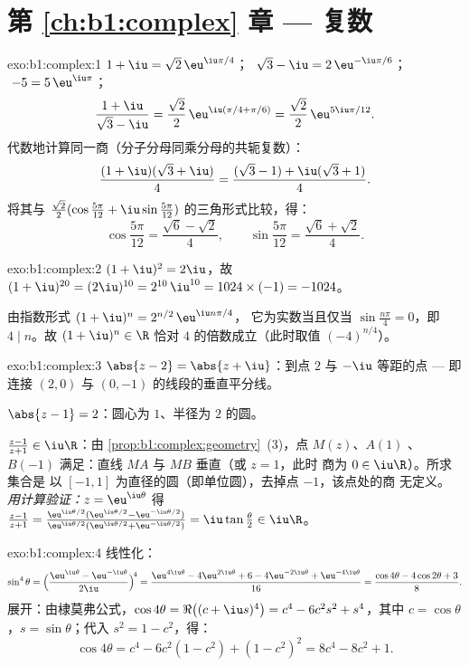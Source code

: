 \section*{第 \ref{ch:b1:complex} 章 --- 复数}

\begin{solution}{exo:b1:complex:1}
$1 + \iu = \sqrt 2\, \eu^{\iu\pi/4}$；
$\;\sqrt 3 - \iu = 2\, \eu^{-\iu\pi/6}$；
$\;-5 = 5\, \eu^{\iu\pi}$；
\[
\frac{1 + \iu}{\sqrt 3 - \iu}
= \frac{\sqrt 2}{2}\, \eu^{\iu(\pi/4 + \pi/6)}
= \frac{\sqrt 2}{2}\, \eu^{5\iu\pi/12}.
\]
代数地计算同一商（分子分母同乘分母的共轭复数）：
\[
\frac{(1 + \iu)(\sqrt 3 + \iu)}{4}
= \frac{(\sqrt 3 - 1) + \iu(\sqrt 3 + 1)}{4}.
\]
将其与 $\frac{\sqrt 2}{2}(\cos\frac{5\pi}{12} +
\iu\sin\frac{5\pi}{12})$ 的三角形式比较，得：
\[
\cos\frac{5\pi}{12} = \frac{\sqrt 6 - \sqrt 2}{4},
\qquad
\sin\frac{5\pi}{12} = \frac{\sqrt 6 + \sqrt 2}{4}.
\]
\end{solution}

\begin{solution}{exo:b1:complex:2}
$(1+\iu)^2 = 2\iu$，故 $(1+\iu)^{20} = (2\iu)^{10} = 2^{10}\,\iu^{10}
= 1024 \times (-1) = -1024$。

由指数形式 $(1+\iu)^n = 2^{n/2}\, \eu^{\iu n\pi/4}$，
它为实数当且仅当 $\sin\frac{n\pi}{4} = 0$，即 $4 \mid n$。故 $(1+\iu)^n
\in \R$ 恰对 $4$ 的倍数成立（此时取值 $(-4)^{n/4}$）。
\end{solution}

\begin{solution}{exo:b1:complex:3}
$\abs{z - 2} = \abs{z + \iu}$：到点 $2$ 与
$-\iu$ 等距的点 --- 即连接 $(2, 0)$
与 $(0, -1)$ 的线段的垂直平分线。

$\abs{z - 1} = 2$：圆心为 $1$、半径为 $2$ 的圆。

$\frac{z-1}{z+1} \in \iu\R$：由
\cref{prop:b1:complex:geometry}~(3)，点 $M(z)$、$A(1)$
、$B(-1)$ 满足：直线 $MA$ 与 $MB$ 垂直（或 $z = 1$，此时
商为 $0 \in \iu\R$）。所求集合是
以 $[-1, 1]$ 为直径的圆（即单位圆），去掉点 $-1$，该点处的商
无定义。\emph{用计算验证：}$z = \eu^{\iu\theta}$ 得
$\frac{z-1}{z+1} = \frac{\eu^{\iu\theta/2}(\eu^{\iu\theta/2} -
\eu^{-\iu\theta/2})}{\eu^{\iu\theta/2}(\eu^{\iu\theta/2} +
\eu^{-\iu\theta/2})} = \iu\tan\frac\theta2 \in \iu\R$。
\end{solution}

\begin{solution}{exo:b1:complex:4}
线性化：
\[
\sin^4\theta
= \Bigl(\frac{\eu^{\iu\theta} - \eu^{-\iu\theta}}{2\iu}\Bigr)^{\!4}
= \frac{\eu^{4\iu\theta} - 4\eu^{2\iu\theta} + 6 - 4\eu^{-2\iu\theta}
+ \eu^{-4\iu\theta}}{16}
= \frac{\cos 4\theta - 4\cos 2\theta + 3}{8}.
\]
展开：由棣莫弗公式，$\cos 4\theta = \Re\bigl((c +
\iu s)^4\bigr) = c^4 - 6c^2 s^2 + s^4$，其中 $c = \cos\theta$，$s =
\sin\theta$；代入 $s^2 = 1 - c^2$，得：
\[
\cos 4\theta = c^4 - 6c^2(1 - c^2) + (1 - c^2)^2
= 8c^4 - 8c^2 + 1 .
\]
\end{solution}

